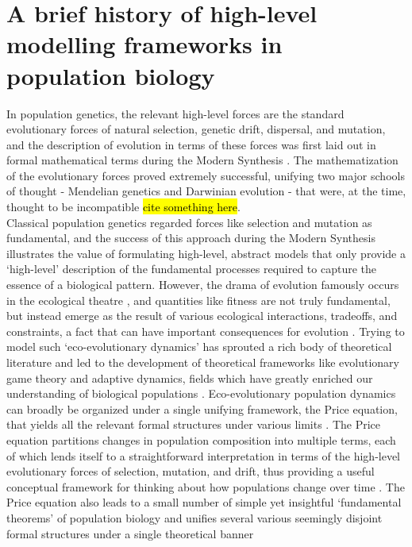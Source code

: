 \section{A brief history of high-level modelling frameworks in population biology}

In population genetics, the relevant high-level forces are the standard evolutionary forces of natural selection, genetic drift, dispersal, and mutation, and the description of evolution in terms of these forces was first laid out in formal mathematical terms during the Modern Synthesis \citep{ewens_mathematical_2004}. The mathematization of the evolutionary forces proved extremely successful, unifying two major schools of thought - Mendelian genetics and Darwinian evolution - that were, at the time, thought to be incompatible \hl{cite something here}.\\
Classical population genetics regarded forces like selection and mutation as fundamental, and the success of this approach during the Modern Synthesis illustrates the value of formulating high-level, abstract models that only provide a `high-level' description of the fundamental processes required to capture the essence of a biological pattern. However, the drama of evolution famously occurs in the ecological theatre \citep{hutchinson_ecological_1965}, and quantities like fitness are not truly fundamental, but instead emerge as the result of various ecological interactions, tradeoffs, and constraints, a fact that can have important consequences for evolution \citep{coulson_putting_2006, kokko_can_2017}. Trying to model such `eco-evolutionary dynamics' has sprouted a rich body of theoretical literature and led to the development of theoretical frameworks like evolutionary game theory and adaptive dynamics, fields which have greatly enriched our understanding of biological populations \citep{brown_why_2016}. Eco-evolutionary population dynamics can broadly be organized under a single unifying framework, the Price equation, that yields all the relevant formal structures under various limits \citep{page_unifying_2002, lion_theoretical_2018}. The Price equation partitions changes in population composition into multiple terms, each of which lends itself to a straightforward interpretation in terms of the high-level evolutionary forces of selection, mutation, and drift, thus providing a useful conceptual framework for thinking about how populations change over time \citep{frank_natural_2012}. The Price equation also leads to a small number of simple yet insightful `fundamental theorems' of population biology \citep{queller_fundamental_2017, lion_theoretical_2018, lehtonen_price_2018} and unifies several various seemingly disjoint formal structures under a single theoretical banner \citep{ lehtonen_price_2020, luque_mirror_2021}\\
